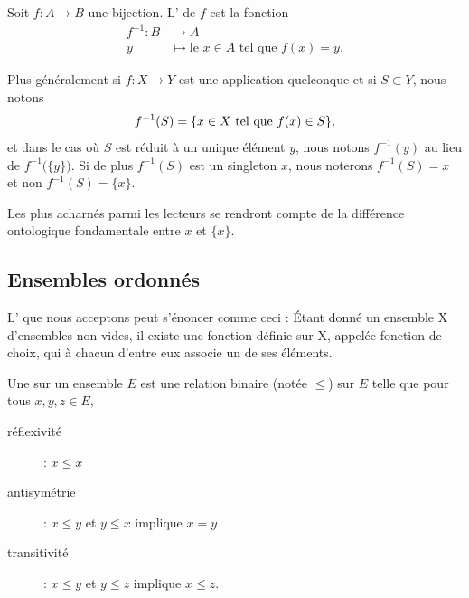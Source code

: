 \begin{definition}      \label{DEFooTRGYooRxORpY}
    Soit \( f\colon A\to B\) une bijection. L' de \( f\) est la fonction
    \begin{equation}
        \begin{aligned}
            f^{-1}\colon B&\to A \\
            y&\mapsto \text{le } x\in A\text{ tel que } f(x)=y.
        \end{aligned}
    \end{equation}


  Plus généralement si \( f\colon X\to Y\) est une application quelconque et si \( S\subset Y\), nous notons
  \begin{equation}
      f^{-1}(S)=\{ x\in X\text{ tel que } f(x)\in S \},
  \end{equation}
  et dans le cas où \( S\) est réduit à un unique élément \( y\), nous notons \( f^{-1}(y)\) au lieu de \( f^{-1}\big( \{ y \} \big)\). Si de plus \( f^{-1}(S)\) est un singleton \( x\), nous noterons \( f^{-1}(S)=x\) et non \( f^{-1}(S)=\{ x \}\).
\end{definition}

Les plus acharnés parmi les lecteurs se rendront compte de la différence ontologique fondamentale entre \( x\) et \( \{ x \}\).

\subsection{Ensembles ordonnés}

\begin{normaltext}\label{NORooLMBYooYjUoju}
L' que nous acceptons peut s'énoncer comme ceci\cite{ooKLIXooHbpufL} : Étant donné un ensemble X d'ensembles non vides, il existe une fonction définie sur X, appelée fonction de choix, qui à chacun d'entre eux associe un de ses éléments.
\end{normaltext}

\begin{definition}      \label{DefooFLYOooRaGYRk}
    Une  sur un ensemble \( E\) est une relation binaire (notée \( \leq\)) sur \( E\) telle que pour tous \( x,y,z\in E\),
    \begin{description}
        \item[réflexivité] : \( x\leq x\)
         \item[antisymétrie] : \( x\leq y\) et \( y\leq x\) implique \( x=y\)
         \item[transitivité] : \( x\leq y\) et \( y\leq z\) implique \( x\leq z\).
    \end{description}
\end{definition}

